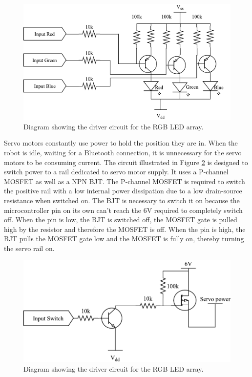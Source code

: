 \begin{figure}[H]
\centering
\includegraphics[scale = 1]{pics/LEDDriver.pdf}
\caption{Diagram showing the driver circuit for the RGB LED array.}
\label{fig:LEDDriver}
\end{figure}

Servo motors constantly use power to hold the position they are in. When the robot is idle, waiting for a Bluetooth connection, it is unnecessary for the servo motors to be consuming current. The circuit illustrated in Figure \ref{fig:PowerSwitch}  is designed to switch power to a rail dedicated to servo motor supply. It uses a P-channel MOSFET as well as a NPN BJT. The P-channel MOSFET is required to switch the positive rail with a low internal power dissipation due to a low drain-source resistance when switched on. The BJT is necessary to switch it on because the microcontroller pin on its own can't reach the 6V required to completely switch off. When the pin is low, the BJT is switched off, the MOSFET gate is pulled high by the resistor and therefore the MOSFET is off. When the pin is high, the BJT pulls the MOSFET gate low and the MOSFET is fully on, thereby turning the servo rail on.

\begin{figure}[H]
\centering
\includegraphics[scale = 1]{pics/PowerSwitch.pdf}
\caption{Diagram showing the driver circuit for the RGB LED array.}
\label{fig:PowerSwitch}
\end{figure}

